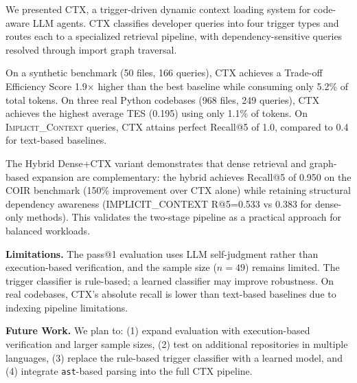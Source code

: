 \documentclass[11pt]{article}
\begin{document}
We presented CTX, a trigger-driven dynamic context loading system for code-aware LLM agents. CTX classifies developer queries into four trigger types and routes each to a specialized retrieval pipeline, with dependency-sensitive queries resolved through import graph traversal.

On a synthetic benchmark (50 files, 166 queries), CTX achieves a Trade-off Efficiency Score 1.9$\times$ higher than the best baseline while consuming only 5.2\% of total tokens. On three real Python codebases (968 files, 249 queries), CTX achieves the highest average TES (0.195) using only 1.1\% of tokens. On \textsc{Implicit\_Context} queries, CTX attains perfect Recall@5 of 1.0, compared to 0.4 for text-based baselines.

The Hybrid Dense+CTX variant demonstrates that dense retrieval and graph-based expansion are complementary: the hybrid achieves Recall@5 of 0.950 on the COIR benchmark (150\% improvement over CTX alone) while retaining structural dependency awareness (IMPLICIT\_CONTEXT R@5=0.533 vs 0.383 for dense-only methods). This validates the two-stage pipeline as a practical approach for balanced workloads.

\textbf{Limitations.} The pass@1 evaluation uses LLM self-judgment rather than execution-based verification, and the sample size ($n=49$) remains limited. The trigger classifier is rule-based; a learned classifier may improve robustness. On real codebases, CTX's absolute recall is lower than text-based baselines due to indexing pipeline limitations.

\textbf{Future Work.} We plan to: (1) expand evaluation with execution-based verification and larger sample sizes, (2) test on additional repositories in multiple languages, (3) replace the rule-based trigger classifier with a learned model, and (4) integrate \texttt{ast}-based parsing into the full CTX pipeline.



\end{document}
